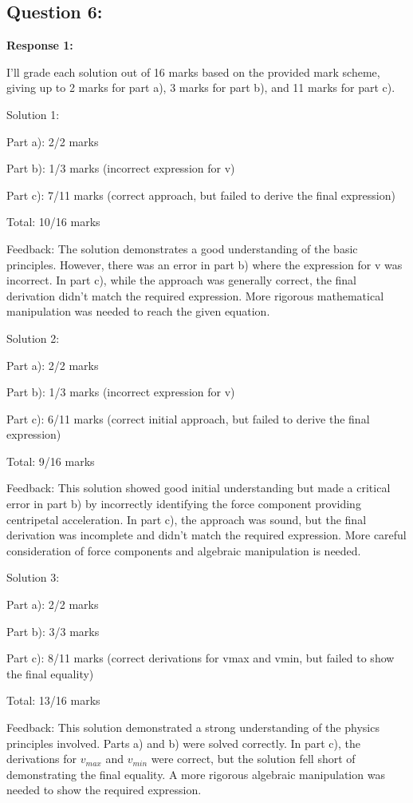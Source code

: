 \documentclass[a4paper,11pt]{article}
\begin{document}
\subsection*{Question 6:}

\textbf{Response 1:}

I'll grade each solution out of 16 marks based on the provided mark scheme, giving up to 2 marks for part a), 3 marks for part b), and 11 marks for part c).

Solution 1:

Part a): 2/2 marks

Part b): 1/3 marks (incorrect expression for v)

Part c): 7/11 marks (correct approach, but failed to derive the final expression)

Total: 10/16 marks

Feedback: The solution demonstrates a good understanding of the basic principles. However, there was an error in part b) where the expression for v was incorrect. In part c), while the approach was generally correct, the final derivation didn't match the required expression. More rigorous mathematical manipulation was needed to reach the given equation.

Solution 2:

Part a): 2/2 marks

Part b): 1/3 marks (incorrect expression for v)

Part c): 6/11 marks (correct initial approach, but failed to derive the final expression)

Total: 9/16 marks

Feedback: This solution showed good initial understanding but made a critical error in part b) by incorrectly identifying the force component providing centripetal acceleration. In part c), the approach was sound, but the final derivation was incomplete and didn't match the required expression. More careful consideration of force components and algebraic manipulation is needed.

Solution 3:

Part a): 2/2 marks

Part b): 3/3 marks

Part c): 8/11 marks (correct derivations for vmax and vmin, but failed to show the final equality)

Total: 13/16 marks

Feedback: This solution demonstrated a strong understanding of the physics principles involved. Parts a) and b) were solved correctly. In part c), the derivations for \(v_{max}\) and \(v_{min}\) were correct, but the solution fell short of demonstrating the final equality. A more rigorous algebraic manipulation was needed to show the required expression.
\end{document}
